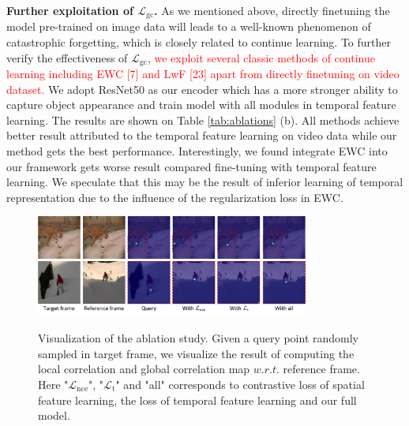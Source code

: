 \documentclass{article}
\begin{document}
\textbf{Further exploitation of $\mathcal{L}_{\mathrm{gc}}$.} As we mentioned above, directly finetuning the model pre-trained on image data will leads to a well-known phenomenon of catastrophic forgetting, which is closely related to continue learning. To further verify the effectiveness of  $\mathcal{L}_{\mathrm{gc}}$,  \textcolor{red}{we exploit several classic methods of continue learning including EWC [7] and LwF [23] apart from directly finetuning on video dataset.}  We adopt ResNet50 as our encoder which has a more stronger ability to capture object appearance and train model with all modules in temporal feature learning. The results are shown on Table \ref{tab:ablations} (b). All methods achieve  better result attributed to the temporal feature learning on video data while our method gets the best performance.  Interestingly, we found integrate EWC into our framework gets  worse result compared fine-tuning with temporal feature learning. We speculate that this may be the result of inferior learning of temporal representation due to the influence of the regularization loss in EWC. 

\begin{figure}[!tb]
  \centering
  {\includegraphics[width=0.8\textwidth]{figure/abalations/ablataions.pdf}}
  \caption{\small Visualization of the ablation study. Given a query point randomly sampled in target frame, we visualize the result of computing the local correlation and global correlation map $w.r.t.$ reference frame. Here "$\mathcal{L}_{\mathrm{nce}}$", "$\mathcal{L}_{\mathrm{t}}$" and "all" corresponds to contrastive loss of spatial feature learning, the loss of temporal feature learning and our full model. }
  \label{fig:ablations}
  \vspace{-5mm}
\end{figure}
\end{document}
